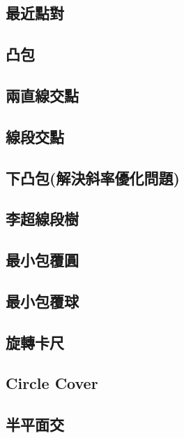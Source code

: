 \documentclass[a4paper,10pt,twocolumn,oneside]{article}
\begin{document}
\subsection{最近點對}

\subsection{凸包}

\subsection{兩直線交點}

\subsection{線段交點}

\subsection{下凸包(解決斜率優化問題)}

\subsection{李超線段樹}

\subsection{最小包覆圓}

\subsection{最小包覆球}

\subsection{旋轉卡尺}

\subsection{Circle Cover }

% 
\subsection{半平面交}

% 
\end{document}

